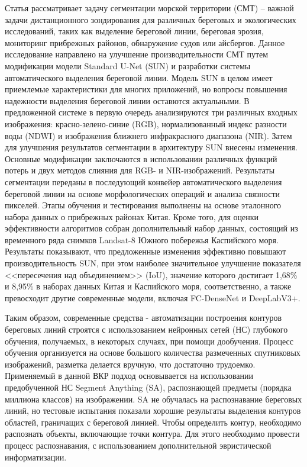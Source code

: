 \documentclass[732,14pt,final]{studrep}
\begin{document}
Статья \cite{b3} рассматривает задачу сегментации морской территории (СМТ) -- важной задачи дистанционного зондирования для различных береговых и экологических исследований, таких как выделение береговой линии, береговая эрозия, мониторинг прибрежных районов, обнаружение судов или айсбергов. Данное исследование направлено на улучшение производительности СМТ путем модификации модели Standard U-Net (SUN) и разработки системы автоматического выделения береговой линии. Модель SUN в целом имеет приемлемые характеристики для многих приложений, но вопросы повышения надежности выделения береговой линии оставются актуальными. В предложенной системе в первую очередь анализируются три различных входных изображения: красно-зелено-синие (RGB), нормализованный индекс разности воды (NDWI) и изображения ближнего инфракрасного диапазона (NIR).  Затем для улучшения результатов сегментации в архитектуру SUN внесены изменения. Основные модификации заключаются в использовании различных функций потерь и двух методов слияния для RGB- и NIR-изображений. Результаты сегментации переданы в последующий конвейер автоматического выделения береговой линии на основе морфологических операций и анализа связности пикселей. Этапы обучения и тестирования выполнены на основе эталонного набора данных о прибрежных районах Китая. Кроме того, для оценки эффективности алгоритмов собран дополнительный набор данных, состоящий из временного ряда снимков Landsat-8 Южного побережья Каспийского моря. Результаты показывают, что предложенные изменения эффективно повышают производительность SUN, при этом наиболее значительное улучшение показателя <<пересечения над объединением>> (IoU), значение которого достигает 1,68\% и 8,95\% в наборах данных Китая и Каспийского моря, соответственно, а также превосходит другие современные модели, включая FC-DenseNet и DeepLabV3+.

Таким образом, современные средства \cite{b1}-\cite{b3} автоматизации построения контуров береговых линий строятся с использованием нейронных сетей (НС) глубокого обучения, получаемых, в некоторых случаях, при помощи дообучения. Процесс обучения организуется на основе большого количества размеченных спутниковых изображений, разметка делается вручную, что достаточно трудоемко. Применяемый в данной ВКР подход основывается на использовании предобученной НС Segment Anything (SA), распознающей предметы (порядка миллиона классов) на изображении. SA не обучалась на распознавание береговых линий, но тестовые испытания показали хорошие результаты выделения контуров областей, граничащих с береговой линией. Чтобы определить контур, необходимо распознать объекты, включающие точки контура. Для этого необходимо провести процесс распознавания, с использованием дополнительной эвристической информатизации.
\end{document}
